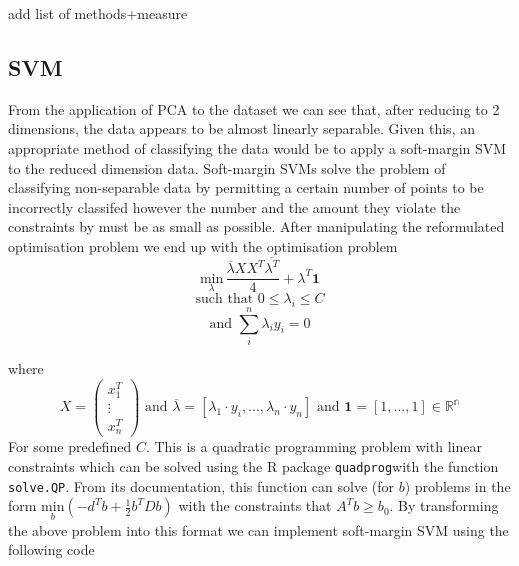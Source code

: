 \documentclass[]{article}
\begin{document}
add list of methods+measure

\subsection{SVM}\label{svm}

From the application of PCA to the dataset we can see that, after
reducing to 2 dimensions, the data appears to be almost linearly
separable. Given this, an appropriate method of classifying the data
would be to apply a soft-margin SVM to the reduced dimension data.
Soft-margin SVMs solve the problem of classifying non-separable data by
permitting a certain number of points to be incorrectly classifed
however the number and the amount they violate the constraints by must
be as small as possible. After manipulating the reformulated
optimisation problem we end up with the optimisation problem \[
\underset{\lambda}{\text{min}} \, \frac{\overline{\lambda}X X^{T}\overline{\lambda^{T}}}{4}
+ \lambda^{T}\bm{1}
\] \[
\text{such that } 0 \leq \lambda_{i} \leq C
\] \[
\text{and } \sum\limits_{i}^{n} \lambda_{i}y_{i} = 0
\]

where \[
X = \begin{pmatrix}
x_{1}^{T} \\
\vdots \\
x_{n}^{T}
\end{pmatrix} \text{ and } 
\overline{\lambda} = [\lambda_{1} \cdot y_{i}, ... , \lambda_{n} \cdot y_{n}] \text{ and } \bm{1} = [1, ..., 1] \in \mathbb{R^{n}}
\] For some predefined \(C\). This is a quadratic programming problem
with linear constraints which can be solved using the R package
\texttt{quadprog}with the function \texttt{solve.QP}. From its
documentation, this function can solve (for \(b\)) problems in the form
\(\underset{b}{\text{min}}(-d^{T}b + \frac{1}{2} b^{T}Db)\) with the
constraints that \(A^{T} b \geq b_0\). By transforming the above problem
into this format we can implement soft-margin SVM using the following
code
\end{document}
